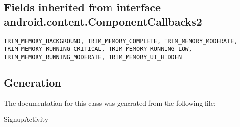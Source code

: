 \subsection{Fields inherited from interface android.content.ComponentCallbacks2}


\begin{lstlisting}
TRIM_MEMORY_BACKGROUND, TRIM_MEMORY_COMPLETE, TRIM_MEMORY_MODERATE, TRIM_MEMORY_RUNNING_CRITICAL, TRIM_MEMORY_RUNNING_LOW, TRIM_MEMORY_RUNNING_MODERATE, TRIM_MEMORY_UI_HIDDEN
\end{lstlisting}

\subsection{Generation}
The documentation for this class was generated from the following file\-:
\begin{DoxyCompactItemize}
\item SignupActivity
\end{DoxyCompactItemize} 









